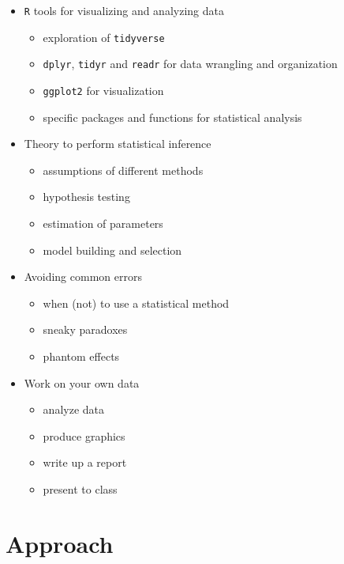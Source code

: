 \documentclass[
  letterpaper,
  DIV=11,
  numbers=noendperiod]{scrreprt}
\providecommand{\tightlist}{%
  \setlength{\itemsep}{0pt}\setlength{\parskip}{0pt}}\usepackage{longtable,booktabs,array}
\begin{document}
\begin{itemize}
\tightlist
\item
  \texttt{R} tools for visualizing and analyzing data

  \begin{itemize}
  \tightlist
  \item
    exploration of \texttt{tidyverse}
  \item
    \texttt{dplyr}, \texttt{tidyr} and \texttt{readr} for data wrangling
    and organization
  \item
    \texttt{ggplot2} for visualization
  \item
    specific packages and functions for statistical analysis
  \end{itemize}
\item
  Theory to perform statistical inference

  \begin{itemize}
  \tightlist
  \item
    assumptions of different methods
  \item
    hypothesis testing
  \item
    estimation of parameters
  \item
    model building and selection
  \end{itemize}
\item
  Avoiding common errors

  \begin{itemize}
  \tightlist
  \item
    when (not) to use a statistical method
  \item
    sneaky paradoxes
  \item
    phantom effects
  \end{itemize}
\item
  Work on your own data

  \begin{itemize}
  \tightlist
  \item
    analyze data
  \item
    produce graphics
  \item
    write up a report
  \item
    present to class
  \end{itemize}
\end{itemize}

\section*{Approach}\label{approach}
\end{document}
